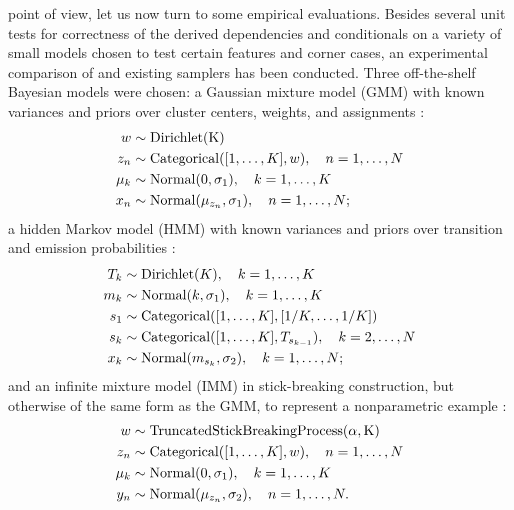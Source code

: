  point of view, let us now turn to some empirical evaluations.
Besides several unit tests for correctness of the derived dependencies and conditionals on a variety
of small models chosen to test certain features and corner cases, an experimental comparison of
\autogibbsjl{} and existing \turingjl{} samplers has been conducted.  Three off-the-shelf Bayesian
models were chosen: a Gaussian mixture model (GMM) with known variances and priors over cluster
centers, weights, and assignments \parencite[section 6.2]{marin2007bayesian}:
\begin{equation}
  \label{eq:gmm}
  \begin{aligned}
    w &\sim \mathrm{Dirichlet(K)} \\
    z_{n} &\sim \mathrm{Categorical}([1, \ldots, K], w), \quad n = 1, \ldots, N \\
    \mu_{k} &\sim \mathrm{Normal}(0, \sigma_{1}), \quad k = 1, \ldots, K \\
    x_{n} &\sim \mathrm{Normal}(\mu_{z_{n}}, \sigma_{1}), \quad n = 1, \ldots, N;
  \end{aligned}
\end{equation}
a hidden Markov model
(HMM) with known variances and priors over transition and emission probabilities \parencite[section
7.3]{marin2007bayesian}:
\begin{equation}
  \label{eq:hmm}
  \begin{aligned}
    T_{k} &\sim \mathrm{Dirichlet}(K), \quad k = 1, \ldots, K \\
    m_{k} &\sim \mathrm{Normal}(k, \sigma_{1}), \quad k = 1, \ldots, K \\
    s_{1} &\sim \mathrm{Categorical}([1, \ldots, K], [1/K, \ldots, 1/K]) \\
    s_{k} &\sim \mathrm{Categorical}([1, \ldots, K], T_{s_{k-1}}), \quad k = 2, \ldots, N \\
    x_{k} &\sim \mathrm{Normal}(m_{s_{k}}, \sigma_{2}), \quad k = 1, \ldots, N;
  \end{aligned}
\end{equation}
and an infinite mixture model (IMM) in stick-breaking construction, but
otherwise of the same form as the GMM, to represent a nonparametric example \parencite[section
2.2]{hjort2010bayesian}:
\begin{equation}
  \label{eq:imm}
  \begin{aligned}
    w &\sim \mathrm{TruncatedStickBreakingProcess(\alpha, K)} \\
    z_{n} &\sim \mathrm{Categorical}([1, \ldots, K], w), \quad n = 1, \ldots, N \\
    \mu_{k} &\sim \mathrm{Normal}(0, \sigma_{1}), \quad k = 1, \ldots, K \\
    y_{n} &\sim \mathrm{Normal}(\mu_{z_{n}}, \sigma_{2}), \quad n = 1, \ldots, N.
  \end{aligned}
\end{equation}
